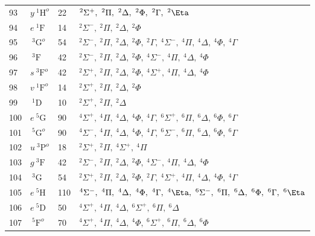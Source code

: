 \begin{table*}[]
\begin{tabular*}{\textwidth}{llll@{\extracolsep{\fill}}}
 93 & $ y~^1\mathrm{H}^o $ &   22& $   ^{2}\Sigma^+,\  ^{2}\Pi,\     ^{2}\Delta,\ ^{2}\Phi,\     ^{2}\Gamma,\ ^{2}\Eta$ \\
 94 & $   e~^1\mathrm{F} $ &   14& $   ^{2}\Sigma^-,\  ^{2}\Pi,\     ^{2}\Delta,\ ^{2}\Phi$ \\
 95 & $  ~^3\mathrm{G}^o $ &   54& $   ^{2}\Sigma^-,\  ^{2}\Pi,\     ^{2}\Delta,\ ^{2}\Phi,\     ^{2}\Gamma,\   ^{4}\Sigma^-,\  ^{4}\Pi,\     ^{4}\Delta,\ ^{4}\Phi,\     ^{4}\Gamma$ \\
 96 & $    ~^3\mathrm{F} $ &   42& $   ^{2}\Sigma^-,\  ^{2}\Pi,\     ^{2}\Delta,\ ^{2}\Phi,\   ^{4}\Sigma^-,\  ^{4}\Pi,\     ^{4}\Delta,\ ^{4}\Phi$ \\
 97 & $ s~^3\mathrm{F}^o $ &   42& $   ^{2}\Sigma^+,\  ^{2}\Pi,\     ^{2}\Delta,\ ^{2}\Phi,\   ^{4}\Sigma^+,\  ^{4}\Pi,\     ^{4}\Delta,\ ^{4}\Phi$ \\
 98 & $ v~^1\mathrm{F}^o $ &   14& $   ^{2}\Sigma^+,\  ^{2}\Pi,\     ^{2}\Delta,\ ^{2}\Phi$ \\
 99 & $    ~^1\mathrm{D} $ &   10& $   ^{2}\Sigma^+,\  ^{2}\Pi,\     ^{2}\Delta$ \\
100 & $   e~^5\mathrm{G} $ &   90& $   ^{4}\Sigma^+,\  ^{4}\Pi,\     ^{4}\Delta,\ ^{4}\Phi,\     ^{4}\Gamma,\   ^{6}\Sigma^+,\  ^{6}\Pi,\     ^{6}\Delta,\ ^{6}\Phi,\     ^{6}\Gamma$ \\
101 & $  ~^5\mathrm{G}^o $ &   90& $   ^{4}\Sigma^-,\  ^{4}\Pi,\     ^{4}\Delta,\ ^{4}\Phi,\     ^{4}\Gamma,\   ^{6}\Sigma^-,\  ^{6}\Pi,\     ^{6}\Delta,\ ^{6}\Phi,\     ^{6}\Gamma$ \\
102 & $ u~^3\mathrm{P}^o $ &   18& $   ^{2}\Sigma^+,\  ^{2}\Pi,\   ^{4}\Sigma^+,\  ^{4}\Pi$ \\
103 & $   g~^3\mathrm{F} $ &   42& $   ^{2}\Sigma^-,\  ^{2}\Pi,\     ^{2}\Delta,\ ^{2}\Phi,\   ^{4}\Sigma^-,\  ^{4}\Pi,\     ^{4}\Delta,\ ^{4}\Phi$ \\
104 & $    ~^3\mathrm{G} $ &   54& $   ^{2}\Sigma^+,\  ^{2}\Pi,\     ^{2}\Delta,\ ^{2}\Phi,\     ^{2}\Gamma,\   ^{4}\Sigma^+,\  ^{4}\Pi,\     ^{4}\Delta,\ ^{4}\Phi,\     ^{4}\Gamma$ \\
105 & $   e~^5\mathrm{H} $ &  110& $   ^{4}\Sigma^-,\  ^{4}\Pi,\     ^{4}\Delta,\ ^{4}\Phi,\     ^{4}\Gamma,\ ^{4}\Eta,\   ^{6}\Sigma^-,\  ^{6}\Pi,\     ^{6}\Delta,\ ^{6}\Phi,\     ^{6}\Gamma,\ ^{6}\Eta$ \\
106 & $   e~^5\mathrm{D} $ &   50& $   ^{4}\Sigma^+,\  ^{4}\Pi,\     ^{4}\Delta,\   ^{6}\Sigma^+,\  ^{6}\Pi,\     ^{6}\Delta$ \\
107 & $  ~^5\mathrm{F}^o $ &   70& $   ^{4}\Sigma^+,\  ^{4}\Pi,\     ^{4}\Delta,\ ^{4}\Phi,\   ^{6}\Sigma^+,\  ^{6}\Pi,\     ^{6}\Delta,\ ^{6}\Phi$ \\

\end{tabular*}
\end{table*}
